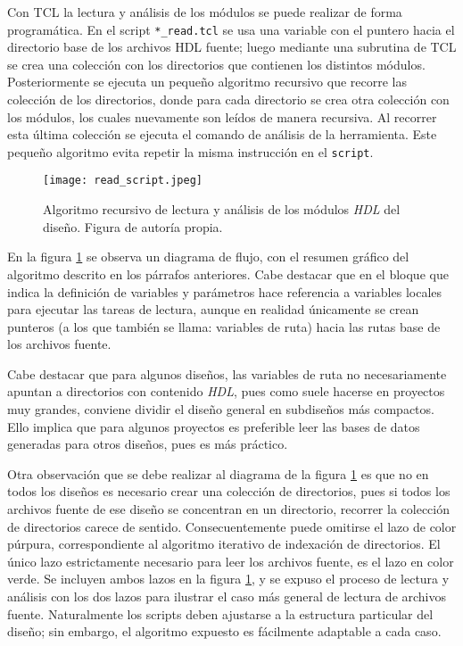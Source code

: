 Con TCL la lectura y análisis de los módulos se puede realizar de forma programática. En el script \texttt{*\_read.tcl} se usa una variable con el puntero hacia el directorio base de los archivos HDL fuente; luego mediante una subrutina de TCL se crea una colección con los directorios que contienen los distintos módulos. Posteriormente se ejecuta un pequeño algoritmo recursivo que recorre las colección de los directorios, donde para cada directorio se crea otra colección con los módulos, los cuales nuevamente son leídos de manera recursiva. Al recorrer esta última colección se ejecuta el comando de análisis de la herramienta. Este pequeño algoritmo evita repetir la misma instrucción en el \texttt{script}.

\begin{figure}[h]
\texttt{[image: read\_script.jpeg]}
\centering
\caption{Algoritmo recursivo de lectura y análisis de los módulos \textit{HDL} del diseño. Figura de autoría propia.}
\label{s_read}
\end{figure}

En la figura \ref{s_read} se observa un diagrama de flujo, con el resumen gráfico del algoritmo descrito en los párrafos anteriores. Cabe destacar que en el bloque que indica la definición de variables y parámetros hace referencia a variables locales para ejecutar las tareas de lectura, aunque en realidad únicamente se crean punteros (a los que también se llama: variables de ruta) hacia las rutas base de los archivos fuente.

Cabe destacar que para algunos diseños, las variables de ruta no necesariamente apuntan a directorios con contenido \textit{HDL}, pues como suele hacerse en proyectos muy grandes, conviene dividir el diseño general en subdiseños más compactos. Ello implica que para algunos proyectos es preferible leer las bases de datos generadas para otros diseños, pues es más práctico.

Otra observación que se debe realizar al diagrama de la figura \ref{s_read} es que no en todos los diseños es necesario crear una colección de directorios, pues si todos los archivos fuente de ese diseño se concentran en un directorio, recorrer la colección de directorios carece de sentido. Consecuentemente puede omitirse el lazo de color púrpura, correspondiente al algoritmo iterativo de indexación de directorios. El único lazo estrictamente necesario para leer los archivos fuente, es el lazo en color verde. Se incluyen ambos lazos en la figura \ref{s_read}, y se expuso el proceso de lectura y análisis con los dos lazos para ilustrar el caso más general de lectura de archivos fuente. Naturalmente los scripts deben ajustarse a la estructura particular del diseño; sin embargo, el algoritmo expuesto es fácilmente adaptable a cada caso.

